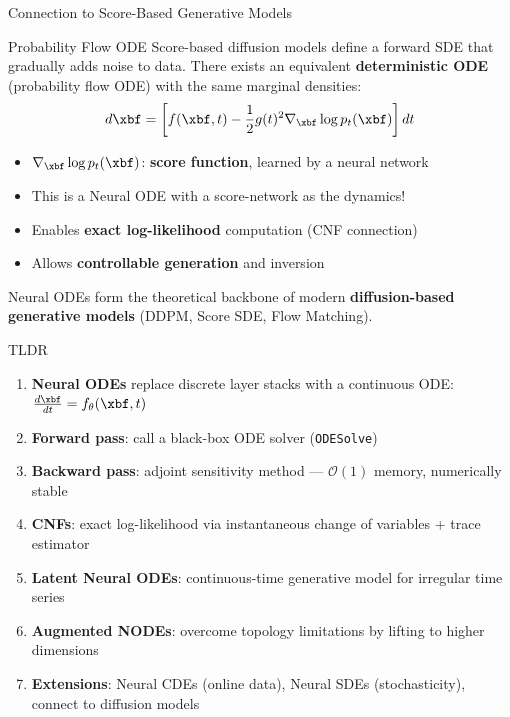 \documentclass[aspectratio=169,xcolor=dvipsnames,svgnames,x11names,fleqn]{beamer}
\begin{document}
\begin{frame}{Connection to Score-Based Generative Models}
\scriptsize

\begin{tblockFrost}{Probability Flow ODE}
Score-based diffusion models define a forward SDE that gradually adds noise to data. There exists an equivalent \textbf{deterministic ODE} (probability flow ODE) with the same marginal densities:
$$
  d\xbf = \left[f(\xbf, t) - \frac{1}{2}g(t)^2 \nabla_\xbf \log p_t(\xbf)\right] dt
$$
\begin{itemize}
  \item $\nabla_\xbf \log p_t(\xbf)$: \textbf{score function}, learned by a neural network
  \item This is a Neural ODE with a score-network as the dynamics!
  \item Enables \textbf{exact log-likelihood} computation (CNF connection)
  \item Allows \textbf{controllable generation} and inversion
\end{itemize}
\end{tblockFrost}
\begin{alertblock}{}
Neural ODEs form the theoretical backbone of modern \textbf{diffusion-based generative models} (DDPM, Score SDE, Flow Matching).
\end{alertblock}
\end{frame}
 

\begin{frame}{TLDR}
\scriptsize

\begin{tblockFrost}{}
\begin{enumerate}
  \item \textbf{Neural ODEs} replace discrete layer stacks with a continuous ODE: $\frac{d\xbf}{dt} = f_\theta(\xbf, t)$
  \item \textbf{Forward pass}: call a black-box ODE solver (\texttt{ODESolve})
  \item \textbf{Backward pass}: adjoint sensitivity method — $\mathcal{O}(1)$ memory, numerically stable
  \item \textbf{CNFs}: exact log-likelihood via instantaneous change of variables + trace estimator
  \item \textbf{Latent Neural ODEs}: continuous-time generative model for irregular time series
  \item \textbf{Augmented NODEs}: overcome topology limitations by lifting to higher dimensions
  \item \textbf{Extensions}: Neural CDEs (online data), Neural SDEs (stochasticity), connect to diffusion models
\end{enumerate}
\end{tblockFrost}
\end{frame}
 
\end{document}
